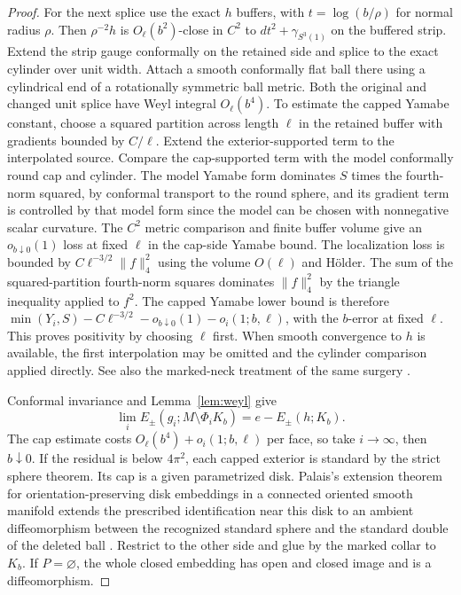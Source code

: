 \documentclass[11pt]{article}
\theoremstyle{definition}
\theoremstyle{remark}
\begin{document}
\begin{proof}
For the next splice use the exact \(h\) buffers, with \(t=\log(b/\rho)\) for normal radius \(\rho\). Then \(\rho^{-2}h\) is \(O_\ell(b^2)\)-close in \(C^2\) to \(dt^2+\gamma_{S^3(1)}\) on the buffered strip. Extend the strip gauge conformally on the retained side and splice to the exact cylinder over unit width. Attach a smooth conformally flat ball there using a cylindrical end of a rotationally symmetric ball metric. Both the original and changed unit splice have Weyl integral \(O_\ell(b^4)\). To estimate the capped Yamabe constant, choose a squared partition across length \(\ell\) in the retained buffer with gradients bounded by \(C/\ell\). Extend the exterior-supported term to the interpolated source. Compare the cap-supported term with the model conformally round cap and cylinder. The model Yamabe form dominates \(S\) times the fourth-norm squared, by conformal transport to the round sphere, and its gradient term is controlled by that model form since the model can be chosen with nonnegative scalar curvature. The \(C^2\) metric comparison and finite buffer volume give an \(o_{b\downarrow0}(1)\) loss at fixed \(\ell\) in the cap-side Yamabe bound. The localization loss is bounded by \(C\ell^{-3/2}\|f\|_4^2\) using the volume \(O(\ell)\) and H\"older. The sum of the squared-partition fourth-norm squares dominates \(\|f\|_4^2\) by the triangle inequality applied to \(f^2\). The capped Yamabe lower bound is therefore \(\min(Y_i,S)-C\ell^{-3/2}-o_{b\downarrow0}(1)-o_i(1;b,\ell)\), with the \(b\)-error at fixed \(\ell\). This proves positivity by choosing \(\ell\) first. When smooth convergence to \(h\) is available, the first interpolation may be omitted and the cylinder comparison applied directly. See also the marked-neck treatment of the same surgery \cite{Baker2026MarkedNecks}.

Conformal invariance and Lemma~\ref{lem:weyl} give
\[
 \lim_i E_\pm(g_i;M\setminus\Phi_iK_b)
    =e-E_\pm(h;K_b).
\]
The cap estimate costs \(O_\ell(b^4)+o_i(1;b,\ell)\) per face, so take \(i\to\infty\), then \(b\downarrow0\). If the residual is below \(4\pi^2\), each capped exterior is standard by the strict sphere theorem. Its cap is a given parametrized disk. Palais's extension theorem for orientation-preserving disk embeddings in a connected oriented smooth manifold extends the prescribed identification near this disk to an ambient diffeomorphism between the recognized standard sphere and the standard double of the deleted ball \cite[Theorem C]{Palais1960Extending}. Restrict to the other side and glue by the marked collar to \(K_b\). If \(P=\varnothing\), the whole closed embedding has open and closed image and is a diffeomorphism.
\end{proof}
\end{document}
